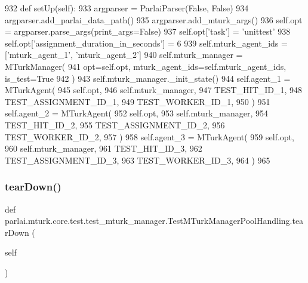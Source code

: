\begin{DoxyCode}
932     \textcolor{keyword}{def }setUp(self):
933         argparser = ParlaiParser(\textcolor{keyword}{False}, \textcolor{keyword}{False})
934         argparser.add\_parlai\_data\_path()
935         argparser.add\_mturk\_args()
936         self.opt = argparser.parse\_args(print\_args=\textcolor{keyword}{False})
937         self.opt[\textcolor{stringliteral}{'task'}] = \textcolor{stringliteral}{'unittest'}
938         self.opt[\textcolor{stringliteral}{'assignment\_duration\_in\_seconds'}] = 6
939         self.mturk\_agent\_ids = [\textcolor{stringliteral}{'mturk\_agent\_1'}, \textcolor{stringliteral}{'mturk\_agent\_2'}]
940         self.mturk\_manager = MTurkManager(
941             opt=self.opt, mturk\_agent\_ids=self.mturk\_agent\_ids, is\_test=\textcolor{keyword}{True}
942         )
943         self.mturk\_manager.\_init\_state()
944         self.agent\_1 = MTurkAgent(
945             self.opt,
946             self.mturk\_manager,
947             TEST\_HIT\_ID\_1,
948             TEST\_ASSIGNMENT\_ID\_1,
949             TEST\_WORKER\_ID\_1,
950         )
951         self.agent\_2 = MTurkAgent(
952             self.opt,
953             self.mturk\_manager,
954             TEST\_HIT\_ID\_2,
955             TEST\_ASSIGNMENT\_ID\_2,
956             TEST\_WORKER\_ID\_2,
957         )
958         self.agent\_3 = MTurkAgent(
959             self.opt,
960             self.mturk\_manager,
961             TEST\_HIT\_ID\_3,
962             TEST\_ASSIGNMENT\_ID\_3,
963             TEST\_WORKER\_ID\_3,
964         )
965 
\end{DoxyCode}
\mbox{\label{classparlai_1_1mturk_1_1core_1_1test_1_1test__mturk__manager_1_1TestMTurkManagerPoolHandling_a9488af956bff1ee47e03dcfd01a32398}} 
\subsubsection{\texorpdfstring{tear\+Down()}{tearDown()}}
{\footnotesize\ttfamily def parlai.\+mturk.\+core.\+test.\+test\+\_\+mturk\+\_\+manager.\+Test\+M\+Turk\+Manager\+Pool\+Handling.\+tear\+Down (\begin{DoxyParamCaption}\item[{}]{self }\end{DoxyParamCaption})}



